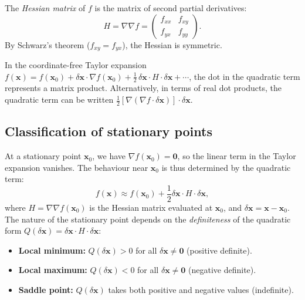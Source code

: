 \documentclass[a4paper]{article}
\begin{document}
\begin{defi}
  The \emph{Hessian matrix} of $f$ is the matrix of second partial derivatives:
  \[
    H = \nabla \nabla f =
    \begin{pmatrix}
      f_{xx}&f_{xy}\\
      f_{yx}&f_{yy}
    \end{pmatrix}.
  \]
  By Schwarz's theorem ($f_{xy} = f_{yx}$), the Hessian is symmetric.
\end{defi}

\begin{remark}
  In the coordinate-free Taylor expansion $f(\mathbf{x}) = f(\mathbf{x}_0) + \delta\mathbf{x}\cdot\nabla f(\mathbf{x}_0) + \frac{1}{2}\,\delta\mathbf{x}\cdot H\cdot\delta\mathbf{x} + \cdots$, the dot in the quadratic term represents a matrix product. Alternatively, in terms of real dot products, the quadratic term can be written $\frac{1}{2}[\nabla(\nabla f\cdot\delta\mathbf{x})]\cdot\delta\mathbf{x}$.
\end{remark}

\subsection{Classification of stationary points}
\begin{remark}
  At a stationary point $\mathbf{x}_0$, we have $\nabla f(\mathbf{x}_0) = \mathbf{0}$, so the linear term in the Taylor expansion vanishes. The behaviour near $\mathbf{x}_0$ is thus determined by the quadratic term:
  \[
    f(\mathbf{x})\approx f(\mathbf{x}_0) + \frac{1}{2}\delta\mathbf{x}\cdot H\cdot \delta\mathbf{x},
  \]
  where $H = \nabla\nabla f(\mathbf{x}_0)$ is the Hessian matrix evaluated at $\mathbf{x}_0$, and $\delta\mathbf{x} = \mathbf{x} - \mathbf{x}_0$. The nature of the stationary point depends on the \emph{definiteness} of the quadratic form $Q(\delta\mathbf{x}) = \delta\mathbf{x} \cdot H \cdot \delta\mathbf{x}$:
  \begin{itemize}
    \item \textbf{Local minimum:} $Q(\delta\mathbf{x}) > 0$ for all $\delta\mathbf{x} \neq \mathbf{0}$ (positive definite).
    \item \textbf{Local maximum:} $Q(\delta\mathbf{x}) < 0$ for all $\delta\mathbf{x} \neq \mathbf{0}$ (negative definite).
    \item \textbf{Saddle point:} $Q(\delta\mathbf{x})$ takes both positive and negative values (indefinite).
  \end{itemize}
\end{remark}
\end{document}

